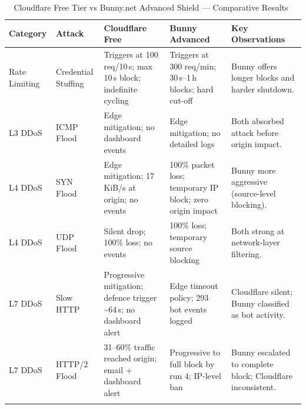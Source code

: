 \documentclass[12pt, a4paper]{report}   %
\begin{document}
\begin{table}[H]
  \centering
  \caption{Cloudflare Free Tier vs Bunny.net Advanced Shield --- Comparative 
  Results~\cite{cf-ddos,bunny-shield-docs,owasp-waf,http2-ddos}}
  \label{tab:comparison}
  \footnotesize
  \setlength{\tabcolsep}{4pt}
  \begin{tabularx}{\textwidth}{@{}l l X X X@{}}
    \toprule
    \textbf{Category} & \textbf{Attack} & \textbf{Cloudflare Free} 
      & \textbf{Bunny Advanced} & \textbf{Key Observations} \\
    \midrule

    Rate Limiting & Credential Stuffing
      & Triggers at 100 req/10\,s; max 10\,s block; indefinite 
        cycling~\cite{cf-rate-limiting}
      & Triggers at 300 req/min; 30\,s--1\,h blocks; hard 
        cut-off~\cite{bunny-shield-docs}
      & Bunny offers longer blocks and harder shutdown. \\
    \addlinespace

    L3 DDoS & ICMP Flood
      & Edge mitigation; no dashboard events~\cite{cf-ddos}
      & Edge mitigation; no detailed logs~\cite{bunny-shield-docs}
      & Both absorbed attack before origin impact. \\
    \addlinespace

    L4 DDoS & SYN Flood
      & Edge mitigation; 17\,KiB/s at origin; no 
        events~\cite{cf-syn-flood}
      & 100\% packet loss; temporary IP block; zero origin 
        impact~\cite{bunny-shield-docs}
      & Bunny more aggressive (source-level blocking). \\
    \addlinespace

    L4 DDoS & UDP Flood
      & Silent drop; 100\% loss; no events~\cite{cf-udp-flood}
      & 100\% loss; temporary source 
        blocking~\cite{bunny-shield-docs}
      & Both strong at network-layer filtering. \\
    \addlinespace

    L7 DDoS & Slow HTTP
      & Progressive mitigation; defence trigger 
        \textasciitilde64\,s; no dashboard alert~\cite{cf-ddos}
      & Edge timeout policy; 293 bot events 
        logged~\cite{bunny-waf-docs}
      & Cloudflare silent; Bunny classified as bot activity. \\
    \addlinespace

    L7 DDoS & HTTP/2 Flood
      & 31--60\% traffic reached origin; email + dashboard 
        alert~\cite{http2-ddos}
      & Progressive to full block by run 4; IP-level 
        ban~\cite{bunny-shield-docs}
      & Bunny escalated to complete block; Cloudflare 
        inconsistent. \\
    \addlinespace


\end{tabularx}
\end{table}
\end{document}
